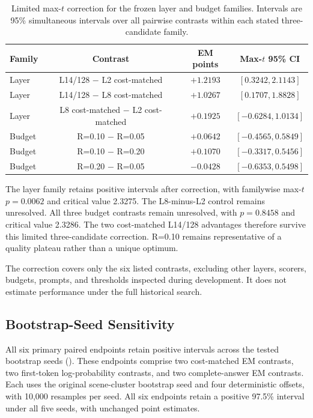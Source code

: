 \begin{table}[t]
\centering
\small
\caption{Limited max-$t$ correction for the frozen layer and budget families. Intervals are 95\% simultaneous intervals over all pairwise contrasts within each stated three-candidate family.}
\label{tab:supp_max_t}
\begin{tabular}{lccc}
\toprule
Family & Contrast & EM points & Max-$t$ 95\% CI \\
\midrule
Layer & L14/128 $-$ L2 cost-matched & $+1.2193$ & $[0.3242,2.1143]$ \\
Layer & L14/128 $-$ L8 cost-matched & $+1.0267$ & $[0.1707,1.8828]$ \\
Layer & L8 cost-matched $-$ L2 cost-matched & $+0.1925$ & $[-0.6284,1.0134]$ \\
Budget & R=0.10 $-$ R=0.05 & $+0.0642$ & $[-0.4565,0.5849]$ \\
Budget & R=0.10 $-$ R=0.20 & $+0.1070$ & $[-0.3317,0.5456]$ \\
Budget & R=0.20 $-$ R=0.05 & $-0.0428$ & $[-0.6353,0.5498]$ \\
\bottomrule
\end{tabular}
\end{table}

The layer family retains positive intervals after correction, with familywise max-$t$ $p=0.0062$ and critical value 2.3275. The L8-minus-L2 control remains unresolved. All three budget contrasts remain unresolved, with $p=0.8458$ and critical value 2.3286. The two cost-matched L14/128 advantages therefore survive this limited three-candidate correction. R=0.10 remains representative of a quality plateau rather than a unique optimum.

The correction covers only the six listed contrasts, excluding other layers, scorers, budgets, prompts, and thresholds inspected during development. It does not estimate performance under the full historical search.

\subsection{Bootstrap-Seed Sensitivity}
All six primary paired endpoints retain positive intervals across the tested bootstrap seeds (). These endpoints comprise two cost-matched EM contrasts, two first-token log-probability contrasts, and two complete-answer EM contrasts. Each uses the original scene-cluster bootstrap seed and four deterministic offsets, with 10,000 resamples per seed. All six endpoints retain a positive 97.5\% interval under all five seeds, with unchanged point estimates.

